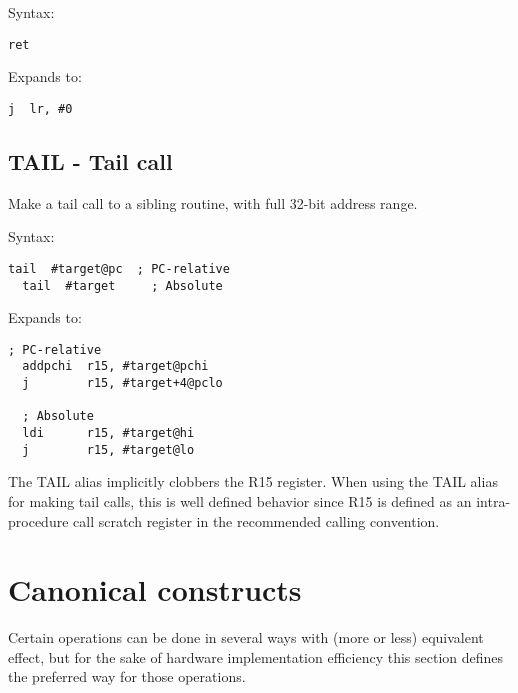 Syntax:
\begin{lstlisting}[style=assembler]
  ret
\end{lstlisting}

Expands to:
\begin{lstlisting}[style=assembler]
  j  lr, #0
\end{lstlisting}

\subsection{TAIL - Tail call}

Make a tail call to a sibling routine, with full 32-bit address range.

Syntax:
\begin{lstlisting}[style=assembler]
  tail  #target@pc  ; PC-relative
  tail  #target     ; Absolute
\end{lstlisting}

Expands to:
\begin{lstlisting}[style=assembler]
  ; PC-relative
  addpchi  r15, #target@pchi
  j        r15, #target+4@pclo

  ; Absolute
  ldi      r15, #target@hi
  j        r15, #target@lo
\end{lstlisting}

\begin{notebox}
The TAIL alias implicitly clobbers the R15 register. When using the TAIL alias
for making tail calls, this is well defined behavior since R15 is defined as an
intra-procedure call scratch register in the recommended calling convention.
\end{notebox}

\section{Canonical constructs}

Certain operations can be done in several ways with (more or less) equivalent
effect, but for the sake of hardware implementation efficiency this section
defines the preferred way for those operations.

\tbd
